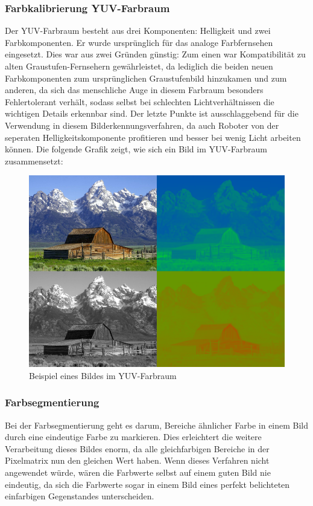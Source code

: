 \documentclass[a4paper,12pt]{article}
\begin{document}
\subsubsection{Farbkalibrierung YUV-Farbraum}
Der YUV-Farbraum besteht aus drei Komponenten: Helligkeit und zwei Farbkomponenten.
Er wurde ursprünglich für das analoge Farbfernsehen eingesetzt.
Dies war aus zwei Gründen günstig: Zum einen war Kompatibilität zu alten
Graustufen-Fernsehern gewährleistet, da lediglich die beiden neuen Farbkomponenten
zum ursprünglichen Graustufenbild hinzukamen und zum anderen, da sich das menschliche
Auge in diesem Farbraum besonders Fehlertolerant verhält, sodass selbst bei
schlechten Lichtverhältnissen die wichtigen Details erkennbar sind.
Der letzte Punkte ist ausschlaggebend für die Verwendung in diesem 
Bilderkennungsverfahren, da auch Roboter von der seperaten
Helligkeitskomponente profitieren und besser bei wenig Licht arbeiten können.
\newpage
Die folgende Grafik zeigt, wie sich ein Bild im YUV-Farbraum zusammensetzt:
\begin{figure}[H]
\includegraphics[scale=0.5]{Barn-yuv.png}
\caption{Beispiel eines Bildes im YUV-Farbraum}
\label{fig:yuv}
\end{figure}

\subsubsection{Farbsegmentierung}
Bei der Farbsegmentierung geht es darum, Bereiche ähnlicher Farbe in einem Bild
durch eine eindeutige Farbe zu markieren. Dies erleichtert die weitere
Verarbeitung dieses Bildes enorm, da alle gleichfarbigen Bereiche in der
Pixelmatrix nun den gleichen Wert haben. Wenn dieses Verfahren nicht angewendet
würde, wären die Farbwerte selbst auf einem guten Bild nie eindeutig, da sich
die Farbwerte sogar in einem Bild eines perfekt belichteten einfarbigen Gegenstandes
unterscheiden.
\end{document}
